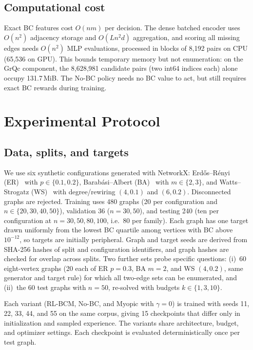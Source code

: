 \documentclass[runningheads]{llncs}
\newcommand{\rlbcm}{RL-BCM}
\begin{document}
\subsection{Computational cost}
Exact BC features cost $O(nm)$ per decision. The dense batched encoder uses
$O(n^2)$ adjacency storage and $O(Ln^2d)$ aggregation, and scoring all
missing edges needs $O(n^2)$ MLP evaluations, processed in blocks of 8,192
pairs on CPU (65,536 on GPU). This bounds temporary memory but not
enumeration: on the GrQc component, the 8,628,981 candidate pairs (two
int64 indices each) alone occupy 131.7\,MiB. The No-BC policy needs no BC
value to act, but still requires exact BC rewards during training.

\section{Experimental Protocol}
\label{sec:protocol}
\subsection{Data, splits, and targets}
We use six synthetic configurations generated with NetworkX: Erd\H{o}s--R\'enyi
(ER)~\cite{Erdos1959} with $p\in\{0.1,0.2\}$, Barab\'asi--Albert
(BA)~\cite{Barabasi1999} with $m\in\{2,3\}$, and Watts--Strogatz
(WS)~\cite{Watts1998} with degree/rewiring $(4,0.1)$ and $(6,0.2)$.
Disconnected graphs are rejected. Training uses 480 graphs (20 per
configuration and $n\in\{20,30,40,50\}$), validation 36 ($n=30,50$), and
testing 240 (ten per configuration at $n=30,50,80,100$, i.e.\ 80 per family).
Each graph has one target drawn uniformly from the lowest BC quartile among
vertices with BC above $10^{-12}$, so targets are initially peripheral.
Graph and target seeds are derived from SHA-256 hashes of split and
configuration identifiers, and graph hashes are checked for overlap across
splits. Two further sets probe specific questions: (i)~60 eight-vertex
graphs (20 each of ER $p=0.3$, BA $m=2$, and WS $(4,0.2)$, same generator
and target rule) for which all two-edge sets can be enumerated, and (ii)~the
60 test graphs with $n=50$, re-solved with budgets $k\in\{1,3,10\}$.

Each variant (\rlbcm, No-BC, and Myopic with $\gamma=0$) is trained with seeds 11, 22, 33, 44,
and 55 on the same corpus, giving 15 checkpoints that differ only in
initialization and sampled experience. The variants share architecture,
budget, and optimizer settings. Each checkpoint is evaluated
deterministically once per test graph.
\end{document}
